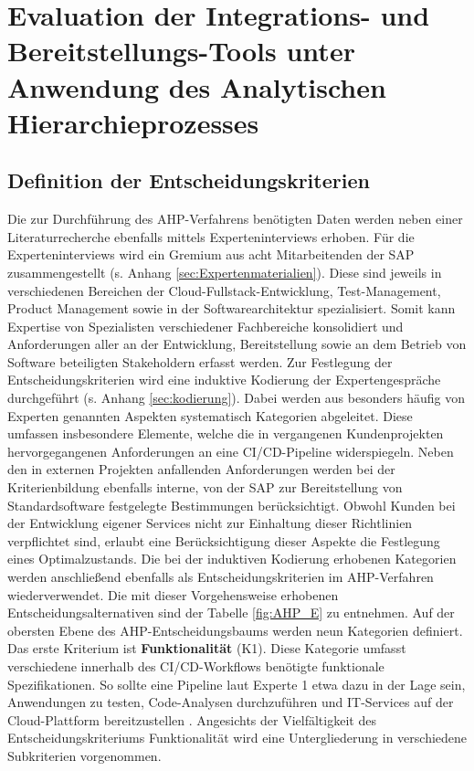 \section{Evaluation der Integrations- und Bereitstellungs-Tools unter Anwendung des Analytischen Hierarchieprozesses}
\label{sec:AHP}
\subsection{Definition der Entscheidungskriterien}
 Die zur Durchführung des AHP-Verfahrens benötigten Daten werden neben einer Literaturrecherche ebenfalls mittels Experteninterviews erhoben. Für die Experteninterviews wird ein Gremium aus acht Mitarbeitenden der SAP zusammengestellt (s. Anhang \ref{sec:Expertenmaterialien}). Diese sind jeweils in verschiedenen Bereichen der Cloud-Fullstack-Entwicklung, Test-Management, Product Management sowie in der Softwarearchitektur spezialisiert. Somit kann Expertise von Spezialisten verschiedener Fachbereiche konsolidiert und Anforderungen aller an der Entwicklung, Bereitstellung sowie an dem Betrieb von Software beteiligten Stakeholdern erfasst werden. Zur Festlegung der Entscheidungskriterien wird eine induktive Kodierung der Expertengespräche durchgeführt (s. Anhang \ref{sec:kodierung}). Dabei werden aus besonders häufig von Experten genannten Aspekten systematisch Kategorien abgeleitet. Diese umfassen insbesondere Elemente, welche die in vergangenen Kundenprojekten hervorgegangenen Anforderungen an eine CI/CD-Pipeline widerspiegeln. Neben den in externen Projekten anfallenden Anforderungen werden bei der Kriterienbildung ebenfalls interne, von der SAP zur Bereitstellung von Standardsoftware festgelegte Bestimmungen berücksichtigt. Obwohl Kunden bei der Entwicklung eigener Services nicht zur Einhaltung dieser Richtlinien verpflichtet sind, erlaubt eine Berücksichtigung dieser Aspekte die Festlegung eines Optimalzustands. Die bei der induktiven Kodierung erhobenen Kategorien werden anschließend ebenfalls als Entscheidungskriterien im AHP-Verfahren wiederverwendet. Die mit dieser Vorgehensweise erhobenen Entscheidungsalternativen sind der Tabelle \ref{fig:AHP_E} zu entnehmen. 
 Auf der obersten Ebene des AHP-Entscheidungsbaums werden neun Kategorien definiert. Das erste Kriterium ist \textbf{Funktionalität} (K1). Diese Kategorie umfasst verschiedene innerhalb des CI/CD-Workflows benötigte funktionale Spezifikationen. So sollte eine Pipeline laut Experte 1 etwa dazu in der Lage sein, Anwendungen zu testen, Code-Analysen durchzuführen und IT-Services auf der Cloud-Plattform bereitzustellen \cite[Z. 72 ff.]{ProductOwnerSAPBTPProd&Infra.}. Angesichts der Vielfältigkeit des Entscheidungskriteriums Funktionalität wird eine Untergliederung in verschiedene Subkriterien vorgenommen. 
